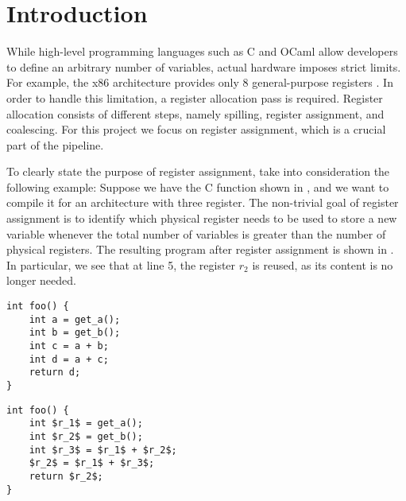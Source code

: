
\chapter{Introduction}
\label{cha:intro}

While high-level programming languages such as C and OCaml allow developers to define an arbitrary number of variables, actual hardware imposes strict limits. For example, the x86 architecture provides only 8 general-purpose registers \cite{intel_sdm_vol1}.
In order to handle this limitation, a register allocation pass is required. Register allocation consists of different steps, namely spilling, register assignment, and coalescing. For this project we focus on register assignment, which is a crucial part of the pipeline.

To clearly state the purpose of register assignment, take into consideration the following example: Suppose we have the C function shown in , and we want to compile it for an architecture with three register. The non-trivial goal of register assignment is to identify which physical register needs to be used to store a new variable whenever the total number of variables is greater than the number of physical registers. The resulting program after register assignment is shown in . In particular, we see that at line 5, the register $r_2$ is reused, as its content is no longer needed.

\begin{minipage}{0.48\linewidth}
\centering
\lstset{style=C}
\begin{lstlisting}[caption={C program returning $2a+b$.}, label={fig:cbefore}]
int foo() {
    int a = get_a();
    int b = get_b();
    int c = a + b;
    int d = a + c;
    return d;
}
\end{lstlisting}
\end{minipage}
\hfill
\begin{minipage}{0.48\linewidth}
\centering
\lstset{style=C}
\begin{lstlisting}[caption={Same C program after register assignment.}, label={fig:cafter}]
int foo() {
    int $r_1$ = get_a();
    int $r_2$ = get_b();
    int $r_3$ = $r_1$ + $r_2$;
    $r_2$ = $r_1$ + $r_3$;
    return $r_2$;
}
\end{lstlisting}
\end{minipage}

